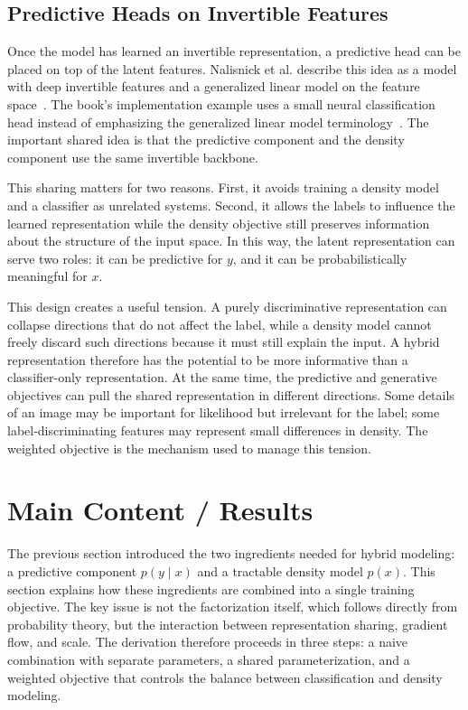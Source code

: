\documentclass[runningheads]{llncs}
\begin{document}
\subsection{Predictive Heads on Invertible Features}

Once the model has learned an invertible representation, a predictive head can be
placed on top of the latent features. Nalisnick et al. describe this idea as a
model with deep invertible features and a generalized linear model on the feature
space~\cite{nalisnick2019hybrid}. The book's implementation example uses a
small neural classification head instead of emphasizing the generalized linear
model terminology~\cite{tomczak2024deep}. The important shared idea is that the
predictive component and the density component use the same invertible backbone.

This sharing matters for two reasons. First, it avoids training a density model
and a classifier as unrelated systems. Second, it allows the labels to influence
the learned representation while the density objective still preserves
information about the structure of the input space. In this way, the latent
representation can serve two roles: it can be predictive for \(y\), and it can be
probabilistically meaningful for \(x\).

This design creates a useful tension. A purely discriminative representation can
collapse directions that do not affect the label, while a density model cannot
freely discard such directions because it must still explain the input. A hybrid
representation therefore has the potential to be more informative than a
classifier-only representation. At the same time, the predictive and generative
objectives can pull the shared representation in different directions.
Some details of an image may be important for likelihood but irrelevant for the
label; some label-discriminating features may represent small differences in
density. The weighted objective is the mechanism used to manage this tension.

\section{Main Content / Results}
\label{sec:main}

The previous section introduced the two ingredients needed for hybrid modeling:
a predictive component \(p(y\mid x)\) and a tractable density model \(p(x)\).
This section explains how these ingredients are combined into a single training
objective. The key issue is not the factorization itself, which follows directly
from probability theory, but the interaction between representation sharing,
gradient flow, and scale. The derivation therefore proceeds in three steps: a
naive combination with separate parameters, a shared parameterization, and a
weighted objective that controls the balance between classification and density
modeling.
\end{document}
